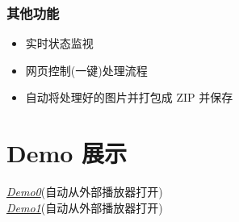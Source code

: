 \documentclass[12pt, a4paper, oneside]{ctexbook}
\begin{document}
	\subsubsection{其他功能}
	\begin{itemize}
		\item 实时状态监视
		\item 网页控制(一键)处理流程
		\item 自动将处理好的图片并打包成 ZIP 并保存
	\end{itemize}
	
	\section{Demo 展示}
	\href{file:./video/demo0.mp4}{\huge{\textit{Demo0}}}(自动从外部播放器打开) \\
	
	\href{file:./video/demo1.mp4}{\huge{\textit{Demo1}}}(自动从外部播放器打开) \\
	

	
	\newpage
	
\end{document}
